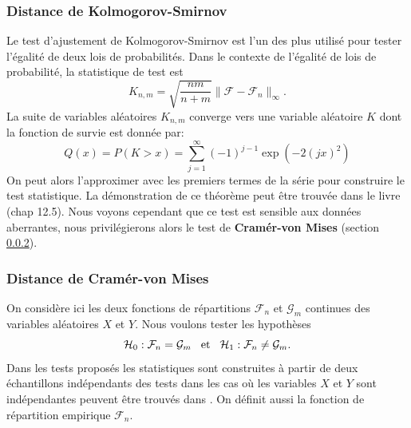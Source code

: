 \documentclass[a4paper,11pt]{article}
\numberwithin{equation}{section}
\begin{document}
\subsubsection{Distance de Kolmogorov-Smirnov}
\label{ch:Kolmogorov-Smirnov-distance}
Le test d'ajustement  de  Kolmogorov-Smirnov \cite{buning2002robustness} est  l'un des plus  utilisé pour tester l'égalité de deux lois  de probabilités. Dans  le  contexte de  l'égalité de lois  de probabilité, la statistique  de  test  est 
\[K_{n,m}= \sqrt{\frac{nm}{n+m}}\|\mathcal{F}-\mathcal{F}_n\|_{\infty}.\]
La suite de variables aléatoires $K_{n,m}$ converge vers une variable aléatoire $K$ dont la fonction de survie est donnée par: 
\begin{equation}
	Q(x)=P(K>x)=\sum_{j=1}^{\infty}(-1)^{j-1}\exp(-2(jx)^2)
\end{equation}
On peut alors l'approximer avec les premiers termes de la série pour construire le test statistique. La démonstration de ce théorème peut être trouvée dans le livre \cite{walker1965probability}(chap 12.5). Nous voyons cependant que ce test est sensible aux données aberrantes, nous privilégierons alors le test de \textbf{Cramér-von Mises} \cite{buning2002robustness} (section \ref{ch:Cv-M distance}).


\subsubsection{Distance de Cramér-von Mises}
\label{ch:Cv-M distance}
On considère ici les deux fonctions de répartitions $\mathcal{F}_{n}$ et $\mathcal{G}_{m}$ continues des variables aléatoires $X$ et $Y$. Nous voulons tester les hypothèses
\begin{equation*}
	\mathcal{H}_0 : \mathcal{F}_{n} = \mathcal{G}_{m} \hspace{3mm}\textrm{et}\hspace{3mm} \mathcal{H}_1 : \mathcal{F}_{n} \neq \mathcal{G}_{m}.
\end{equation*}
Dans les tests proposés les statistiques sont construites à partir de deux échantillons indépendants des tests dans les cas où les variables $X$ et $Y$ sont indépendantes peuvent être trouvés dans \cite{ethier2011propos}. On définit aussi la fonction de répartition empirique $\mathcal{F}_n$.
\end{document}
